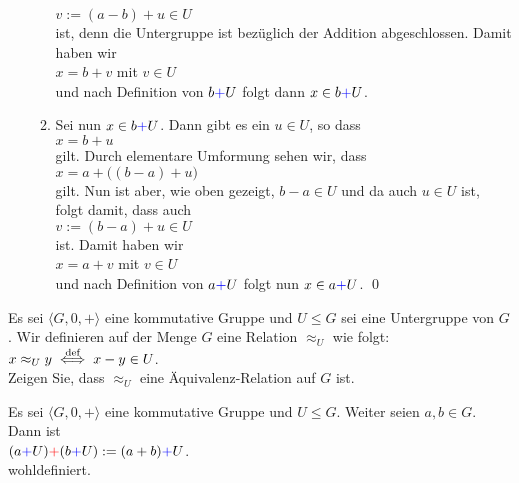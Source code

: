\begin{enumerate}
\begin{enumerate}
        $v := (a - b) + u \in U$
        \\[0.2cm]
        ist, denn die Untergruppe ist bez\"{u}glich der Addition abgeschlossen.  Damit haben wir
        \\[0.2cm]
        \hspace*{1.3cm}
        $x = b + v$ mit $v \in U$
        \\[0.2cm]
        und nach Definition von $b {\color{blue}{+}} U$ folgt dann $x \in b {\color{blue}{+}} U$.
  \item Sei nun $x \in b {\color{blue}{+}} U$.  Dann gibt es ein $u \in U$, so dass
        \\[0.2cm]
        \hspace*{1.3cm}
        $x = b + u$
        \\[0.2cm]
        gilt.  Durch elementare Umformung sehen wir, dass
        \\[0.2cm]
        \hspace*{1.3cm}
        $x = a + \bigl((b - a) + u\bigr)$
        \\[0.2cm]
        gilt. Nun ist aber, wie oben gezeigt, $b - a \in U$ und da auch $u \in U$ ist, folgt damit, dass auch
        \\[0.2cm]
        \hspace*{1.3cm}
        $v := (b - a) + u \in U$
        \\[0.2cm]
        ist.  Damit haben wir
        \\[0.2cm]
        \hspace*{1.3cm}
        $x = a + v$ mit $v \in U$
        \\[0.2cm]
        und nach Definition von $a {\color{blue}{+}} U$ folgt nun $x \in a {\color{blue}{+}} U$. \qed
  \end{enumerate}
\end{enumerate}

\exercise
Es sei $\langle G, 0, + \rangle$ eine kommutative Gruppe und $U \leq G$ sei eine
Untergruppe von $G$.   Wir definieren auf der Menge $G$ eine Relation $\approx_U$ wie folgt:
\\[0.2cm]
\hspace*{1.3cm}
$x \approx_U y \;\stackrel{\mbox{\scriptsize def}}{\Longleftrightarrow}\; x - y \in U$.
\\[0.2cm]
Zeigen Sie, dass $\approx_U$ eine \"{A}quivalenz-Relation auf $G$ ist.
\exend

\begin{Lemma}
  Es sei $\langle G, 0, + \rangle$ eine kommutative Gruppe und $U \leq G$.
  Weiter seien $a,b \in G$.  Dann ist 
  \\[0.2cm]
  \hspace*{1.3cm}
  $(a {\color{blue}{+}} U) {\color{red}{+}} (b {\color{blue}{+}} U) := (a + b) {\color{blue}{+}} U$.
  \\[0.2cm]
  wohldefiniert.
\end{Lemma}

